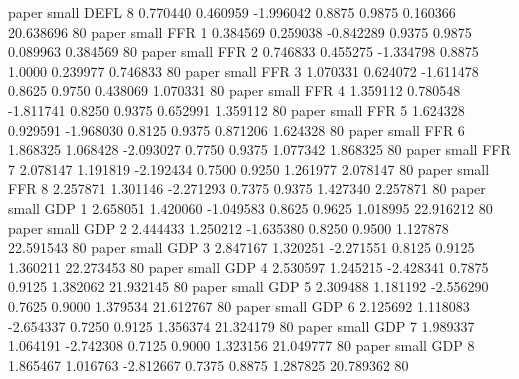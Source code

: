          paper      small     DEFL                 8 0.770440 0.460959 -1.996042 0.8875 0.9875  0.160366   20.638696 80
         paper      small      FFR                 1 0.384569 0.259038 -0.842289 0.9375 0.9875  0.089963    0.384569 80
         paper      small      FFR                 2 0.746833 0.455275 -1.334798 0.8875 1.0000  0.239977    0.746833 80
         paper      small      FFR                 3 1.070331 0.624072 -1.611478 0.8625 0.9750  0.438069    1.070331 80
         paper      small      FFR                 4 1.359112 0.780548 -1.811741 0.8250 0.9375  0.652991    1.359112 80
         paper      small      FFR                 5 1.624328 0.929591 -1.968030 0.8125 0.9375  0.871206    1.624328 80
         paper      small      FFR                 6 1.868325 1.068428 -2.093027 0.7750 0.9375  1.077342    1.868325 80
         paper      small      FFR                 7 2.078147 1.191819 -2.192434 0.7500 0.9250  1.261977    2.078147 80
         paper      small      FFR                 8 2.257871 1.301146 -2.271293 0.7375 0.9375  1.427340    2.257871 80
         paper      small      GDP                 1 2.658051 1.420060 -1.049583 0.8625 0.9625  1.018995   22.916212 80
         paper      small      GDP                 2 2.444433 1.250212 -1.635380 0.8250 0.9500  1.127878   22.591543 80
         paper      small      GDP                 3 2.847167 1.320251 -2.271551 0.8125 0.9125  1.360211   22.273453 80
         paper      small      GDP                 4 2.530597 1.245215 -2.428341 0.7875 0.9125  1.382062   21.932145 80
         paper      small      GDP                 5 2.309488 1.181192 -2.556290 0.7625 0.9000  1.379534   21.612767 80
         paper      small      GDP                 6 2.125692 1.118083 -2.654337 0.7250 0.9125  1.356374   21.324179 80
         paper      small      GDP                 7 1.989337 1.064191 -2.742308 0.7125 0.9000  1.323156   21.049777 80
         paper      small      GDP                 8 1.865467 1.016763 -2.812667 0.7375 0.8875  1.287825   20.789362 80